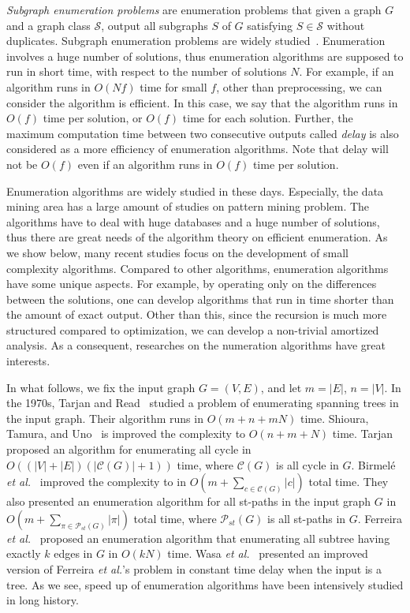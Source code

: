 \documentclass{llncs}
\newcommand{\name}[1]{\textit{#1}}
\begin{document}
\name{Subgraph enumeration problems} are enumeration problems 
that given a graph $G$ and a graph class $\mathcal{S}$, 
output all subgraphs $S$ of $G$ satisfying $S \in \mathcal{S}$ without duplicates. 
Subgraph enumeration problems are widely studied~\cite{Avis:Fukuda:DAM:1996,Ferreira:Grossi:Rizzi:ESA:2011,Shioura:Tamura:Uno:SIAM:1997,Tarjan:Read:1975,Wasa:COCOON:2012,Birmele:etal:SODA:2013,Uno:SIGAL:2003,Tarjan:1973}. 
Enumeration involves a huge number of solutions, 
thus enumeration algorithms are supposed to run in short time, 
with respect to the number of solutions $N$. 
For example, if an algorithm runs in $O(Nf)$ time for small $f$, 
other than preprocessing, 
we can consider the algorithm is efficient. 
In this case, 
we say that the algorithm runs in $O(f)$ time per solution, 
or $O(f)$ time for each solution. 
Further, 
the maximum computation time between two consecutive outputs called \name{delay} is 
also considered as a more efficiency of enumeration algorithms. 
Note that delay will not be $O(f)$ 
even if an algorithm runs in $O(f)$ time per solution. 

Enumeration algorithms are widely studied in these days. 
Especially, 
the data mining area has a large amount of studies on pattern mining problem. 
The algorithms have to deal with huge databases and a huge number of solutions, 
thus there are great needs of the algorithm theory on efficient enumeration. 
As we show below, 
many recent studies focus on the development of small complexity algorithms. 
Compared to other algorithms, 
enumeration algorithms have some unique aspects. 
For example, 
by operating only on the differences between the solutions, 
one can develop algorithms that 
run in time shorter than the amount of exact output. 
Other than this, 
since the recursion is much more structured compared to optimization, 
we can develop a non-trivial amortized analysis. 
As a consequent, 
researches on the numeration algorithms have great interests. 

In what follows, 
we fix the input graph $G = (V, E)$, 
and let $m = |E|$, $n = |V|$. 
In the 1970s, 
Tarjan and Read~\cite{Tarjan:Read:1975} studied 
a problem of enumerating spanning trees in the input graph. 
Their algorithm runs in $O(m+n+mN)$ time. 
Shioura, Tamura, and Uno~\cite{Shioura:Tamura:Uno:SIAM:1997} 
is improved the complexity to $O(n+m+N)$ time. 
Tarjan~\cite{Tarjan:1973} proposed an algorithm for enumerating all cycle 
in $O((|V|+|E|)(|\mathcal{C}(G)|+1))$ time, 
where $\mathcal{C}(G)$ is all cycle in $G$. 
Birmel\'{e} \textit{et al.}~\cite{Birmele:etal:SODA:2013} 
improved the complexity to 
in $O(m + \sum_{c\in\mathcal{C}(G)}|c|)$ total time. 
They also presented an enumeration algorithm for
all st-paths in the input graph $G$ 
in $O(m + \sum_{\pi\in\mathcal{P}_{st}(G)}|\pi|)$ total time, 
where $\mathcal{P}_{st}(G)$ is all st-paths in $G$. 
Ferreira \textit{et al.}~\cite{Ferreira:Grossi:Rizzi:ESA:2011} proposed 
an enumeration algorithm 
that enumerating all subtree having exactly $k$ edges in $G$ in $O(kN)$ time. 
Wasa \textit{et al.}~\cite{Wasa:COCOON:2012} presented 
an improved version of Ferreira \textit{et al.}'s problem in constant time delay 
when the input is a tree. 
As we see, 
speed up of enumeration algorithms have been intensively studied in long history. 
\end{document}
